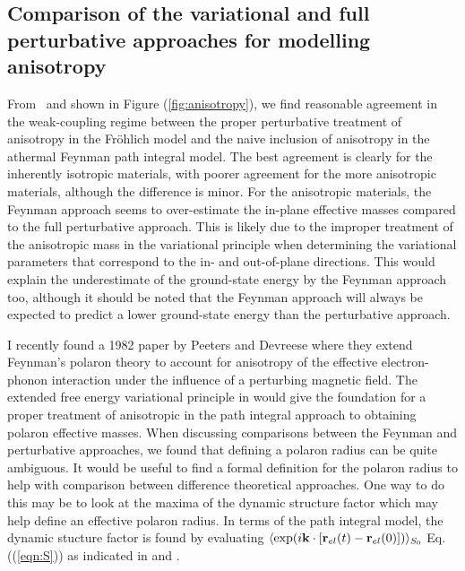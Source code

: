 \subsection{Comparison of the variational and full perturbative approaches for modelling anisotropy}

From~\cite{guster_frohlich_2021} and shown in Figure (\ref{fig:anisotropy}), we find reasonable agreement in the weak-coupling regime between the proper perturbative treatment of anisotropy in the Fr\"ohlich model and the naive inclusion of anisotropy in the athermal Feynman path integral model. The best agreement is clearly for the inherently isotropic materials, with poorer agreement for the more anisotropic materials, although the difference is minor. For the anisotropic materials, the Feynman approach seems to over-estimate the in-plane effective masses compared to the full perturbative approach. This is likely due to the improper treatment of the anisotropic mass in the variational principle when determining the variational parameters that correspond to the in- and out-of-plane directions. This would explain the underestimate of the ground-state energy by the Feynman approach too, although it should be noted that the Feynman approach will always be expected to predict a lower ground-state energy than the perturbative approach. 

I recently found a 1982 paper by Peeters and Devreese \cite{Devreese1982} where they extend Feynman's polaron theory to account for anisotropy of the effective electron-phonon interaction under the influence of a perturbing magnetic field. The extended free energy variational principle in \cite{Devreese1982} would give the foundation for a proper treatment of anisotropic in the path integral approach to obtaining polaron effective masses. When discussing comparisons between the Feynman and perturbative approaches, we found that defining a polaron radius can be quite ambiguous. It would be useful to find a formal definition for the polaron radius to help with comparison between difference theoretical approaches. One way to do this may be to look at the maxima of the dynamic structure factor which may help define an effective polaron radius. In terms of the path integral model, the dynamic stucture factor is found by evaluating $\langle \exp(i \vb{k} \cdot [\vb{r}_{el}(t) - \vb{r}_{el}(0)]) \rangle_{S_0}$ Eq. ((\ref{eqn:S})) as indicated in \cite{Devreese2001} and \cite{Devreesetwo}.